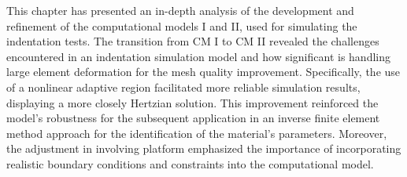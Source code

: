 This chapter has presented an in-depth analysis of the development and refinement of the computational models I and II, used
for simulating the indentation tests. The transition from CM I to CM II revealed the challenges encountered in an indentation 
simulation model and how significant is handling large element deformation for the mesh quality improvement. 
Specifically, the use of a nonlinear adaptive region facilitated more reliable simulation results, displaying a more 
closely Hertzian solution. This improvement reinforced the model's robustness for the subsequent application in an inverse
finite element method approach for the identification of the material's parameters. Moreover, the adjustment in involving platform
emphasized the importance of incorporating realistic boundary conditions and constraints into the computational model.



